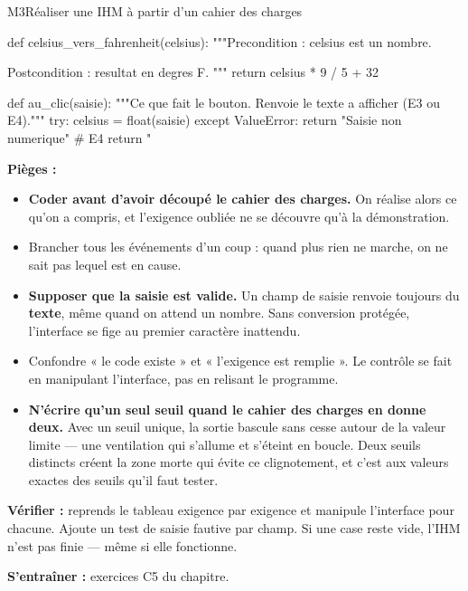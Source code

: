 \begin{fichemethode}{M3}{Réaliser une IHM à partir d'un cahier des charges}
\begin{python}
def celsius_vers_fahrenheit(celsius):
    """Precondition : celsius est un nombre.

    Postcondition : resultat en degres F.
    """
    return celsius * 9 / 5 + 32

def au_clic(saisie):
    """Ce que fait le bouton. Renvoie le texte a afficher (E3 ou E4)."""
    try:
        celsius = float(saisie)
    except ValueError:
        return "Saisie non numerique"      # E4
    return "%
\end{python}


\textbf{Pièges :}
\begin{itemize}
  \item \textbf{Coder avant d'avoir découpé le cahier des charges.} On réalise alors ce qu'on
    a compris, et l'exigence oubliée ne se découvre qu'à la démonstration.
  \item Brancher tous les événements d'un coup : quand plus rien ne marche, on ne sait pas
    lequel est en cause.
  \item \textbf{Supposer que la saisie est valide.} Un champ de saisie renvoie toujours du
    \textbf{texte}, même quand on attend un nombre. Sans conversion protégée, l'interface se
    fige au premier caractère inattendu.
  \item Confondre « le code existe » et « l'exigence est remplie ». Le contrôle se fait en
    manipulant l'interface, pas en relisant le programme.
  \item \textbf{N'écrire qu'un seul seuil quand le cahier des charges en donne deux.} Avec
    un seuil unique, la sortie bascule sans cesse autour de la valeur limite — une ventilation
    qui s'allume et s'éteint en boucle. Deux seuils distincts créent la zone morte qui évite
    ce clignotement, et c'est aux valeurs exactes des seuils qu'il faut tester.
\end{itemize}

\textbf{Vérifier :} reprends le tableau exigence par exigence et manipule l'interface pour
chacune. Ajoute un test de saisie fautive par champ. Si une case reste vide, l'IHM n'est pas
finie — même si elle fonctionne.

\textbf{S'entraîner :} exercices C5 du chapitre.
\end{fichemethode}
